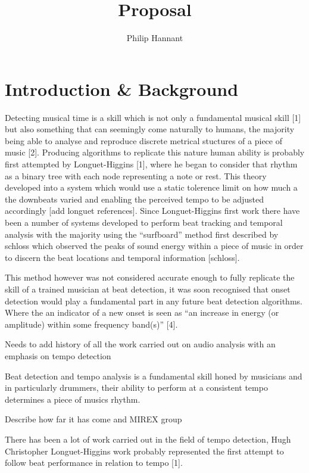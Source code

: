 \documentclass[a4paper, 11pt]{article}
\title{Proposal} \author{Philip Hannant}
\begin{document}
 \maketitle{} \section{Introduction \& Background}

Detecting musical time is a skill which is not only a fundamental musical skill [1] but also something that can seemingly come naturally to humans, the majority being able to analyse and reproduce discrete metrical stuctures of a piece of music [2]. Producing algorithms to replicate this nature human ability is probably first attempted by Longuet-Higgins [1], where he began to consider that rhythm as a binary tree with each node representing a note or rest. This theory developed into a system which would use a static tolerence limit on how much a the downbeats varied and enabling the perceived tempo to be adjusted accordingly [add longuet references]. Since Longuet-Higgins first work there have been a number of systems developed to perform beat tracking and temporal analysis with the majority using the ``surfboard'' method first described by schloss which observed the peaks of sound energy within a piece of music in order to discern the beat locations and temporal information [schloss]. 

This method however was not considered accurate enough to fully replicate the skill of a trained musician at beat detection, it was soon recognised that onset detection would play a fundamental part in any future beat detection algorithms. Where the an indicator of a new onset is seen as ``an increase in energy (or amplitude) within some frequency band(s)'' [4].




Needs to add history of all the work carried out on audio analysis with an emphasis on tempo detection

Beat detection and tempo analysis is a fundamental skill honed by musicians and in particularly drummers, their ability to perform at a consistent tempo determines a piece of musics rhythm. 

Describe how far it has come and MIREX group

There has been a lot of work carried out in the field of tempo detection, Hugh Christopher Longuet-Higgins work probably represented the first attempt to follow beat performance in relation to tempo [1]. 
\end{document}
